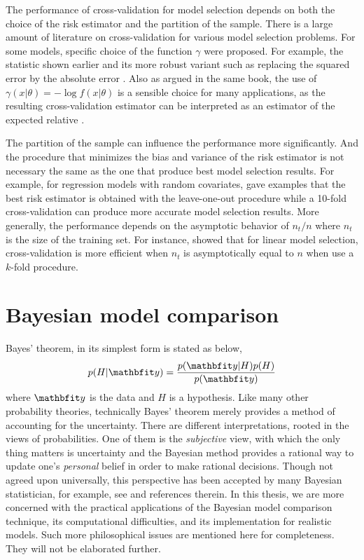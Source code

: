 The performance of cross-validation for model selection depends on both the
choice of the risk estimator and the partition of the sample. There is a large
amount of literature on cross-validation for various model selection problems.
For some models, specific choice of the function $\gamma$ were proposed. For
example, the \press statistic shown earlier and its more robust variant such
as replacing the squared error by the absolute error
\cite[][sec.~2.9]{Claeskens:2008tq}.  Also as argued in the same book, the use
of $\gamma(x|\theta) = -\log f(x|\theta)$ is a sensible choice for many
applications, as the resulting cross-validation estimator can be interpreted
as an estimator of the expected relative \kld.

The partition of the sample can influence the performance more significantly.
And the procedure that minimizes the bias and variance of the risk estimator
is not necessary the same as the one that produce best model selection
results.  For example, for regression models with random covariates,
\cite{Breiman:1992vx} gave examples that the best risk estimator is obtained
with the leave-one-out procedure while a 10-fold cross-validation can produce
more accurate model selection results. More generally, the performance depends
on the asymptotic behavior of $n_t/n$ where $n_t$ is the size of the training
set. For instance, \cite{Shao:1997vx} showed that for linear model selection,
cross-validation is more efficient when $n_t$ is asymptotically equal to $n$
when use a $k$-fold procedure.

\section{Bayesian model comparison}
\label{sec:Bayesian model comparison}

Bayes' theorem, in its simplest form is stated as below,
\begin{equation}
  p(H|\data) = \frac{p(\data|H)p(H)}{p(\data)} \label{eq:bayes}
\end{equation}
where $\data$ is the data and $H$ is a hypothesis. Like many other probability
theories, technically Bayes' theorem merely provides a method of accounting
for the uncertainty. There are different interpretations, rooted in the views
of probabilities. One of them is the \emph{subjective} view, with which the
only thing matters is uncertainty and the Bayesian method provides a rational
way to update one's \emph{personal} belief in order to make rational
decisions. Though not agreed upon universally, this perspective has been
accepted by many Bayesian statistician, for example, see
\cite[][chap.~1]{Bernardo:1994vd} and references therein. In this thesis, we
are more concerned with the practical applications of the Bayesian model
comparison technique, its computational difficulties, and its implementation
for realistic models. Such more philosophical issues are mentioned here for
completeness. They will not be elaborated further.

